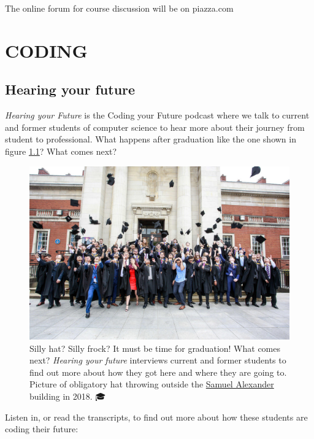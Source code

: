 \documentclass[
]{book}
\begin{document}
The online forum for course discussion will be on piazza.com

\hypertarget{part-coding}{%
\part{CODING}\label{part-coding}}

\hypertarget{hearing}{%
\chapter{Hearing your future}\label{hearing}}

\emph{Hearing your Future} is the Coding your Future podcast where we talk to current and former students of computer science to hear more about their journey from student to professional. What happens after graduation like the one shown in figure \ref{fig:graduation-fig}? What comes next?

\begin{figure}

{\centering \includegraphics[width=1\linewidth]{images/graduation2} 

}

\caption{Silly hat? Silly frock? It must be time for graduation! What comes next? \emph{Hearing your future} interviews current and former students to find out more about how they got here and where they are going to. Picture of obligatory hat throwing outside the \href{https://en.wikipedia.org/wiki/Samuel_Alexander}{Samuel Alexander} building in 2018. 🎓}\label{fig:graduation-fig}
\end{figure}



Listen in, or read the transcripts, to find out more about how these students are coding their future:
\end{document}
